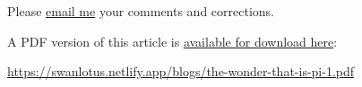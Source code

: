 \documentclass[
  a4paper,
]{article}
\begin{document}
Please \href{mailto:feedback.swanlotus@gmail.com}{email me} your
comments and corrections.

\noindent A PDF version of this article is
\href{./the-wonder-that-is-pi-1.pdf}{available for download here}:

\begin{small}

\begin{sffamily}

\url{https://swanlotus.netlify.app/blogs/the-wonder-that-is-pi-1.pdf}

\end{sffamily}

\end{small}
\end{document}
